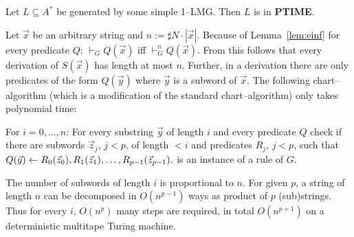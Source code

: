 \begin{thm}
\label{thm:1pol}
Let $L \subseteq A^{\ast}$ be generated by some simple 1--LMG.
Then $L$ is in \textbf{PTIME}.
\end{thm}
\proofbeg
Let $\vec{x}$ be an arbitrary string and $n := \sharp
N \cdot |\vec{x}|$. Because of Lemma~\ref{lem:einf}  for every
predicate $Q$: $\vdash_G Q(\vec{x})$ iff
$\vdash_G^n Q(\vec{x})$.  From this follows that every
derivation of $S(\vec{x})$ has length at most
$n$. Further, in a derivation there are only predicates of the
form $Q(\vec{y})$ where $\vec{y}$ is a subword of $\vec{x}$.
The following chart--algorithm (which is a modification of the
standard chart--algorithm) only takes polynomial time:
\begin{dinglist}{43}
\item For $i = 0, \dotsc, n$:
    For every substring $\vec{y}$ of length $i$ and every
    predicate $Q$ check if there are subwords
    $\vec{z}_j$, $j < p$, of length $< i$ and
    predicates $R_j$, $j < p$, such that $Q(\vec{y})
    \leftarrow R_0(\vec{z}_0),R_1(\vec{z}_1),\dotsc, R_{p-1}(\vec{z}_{p-1}).$
    is an instance of a rule of $G$.
\end{dinglist}
The number of subwords of length $i$ is proportional to $n$. For 
given $p$, a string of length $n$ can be decomposed in $O(n^{p-1})$ 
ways as product of $p$ (sub)strings. Thus for every $i$, $O(n^p)$ 
many steps are required, in total $O(n^{p+1})$ on a deterministic 
multitape Turing machine.
\proofend

